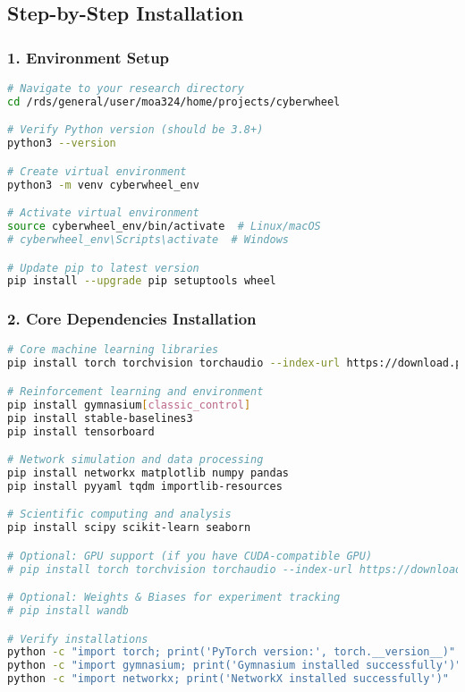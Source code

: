 \documentclass[12pt,a4paper]{article}
\begin{document}
\subsection{Step-by-Step Installation}

\subsubsection{1. Environment Setup}
\begin{lstlisting}[language=bash, caption=Initial Environment Setup]
# Navigate to your research directory
cd /rds/general/user/moa324/home/projects/cyberwheel

# Verify Python version (should be 3.8+)
python3 --version

# Create virtual environment
python3 -m venv cyberwheel_env

# Activate virtual environment
source cyberwheel_env/bin/activate  # Linux/macOS
# cyberwheel_env\Scripts\activate  # Windows

# Update pip to latest version
pip install --upgrade pip setuptools wheel
\end{lstlisting}

\subsubsection{2. Core Dependencies Installation}
\begin{lstlisting}[language=bash, caption=Install Core Dependencies]
# Core machine learning libraries
pip install torch torchvision torchaudio --index-url https://download.pytorch.org/whl/cpu

# Reinforcement learning and environment
pip install gymnasium[classic_control]
pip install stable-baselines3
pip install tensorboard

# Network simulation and data processing
pip install networkx matplotlib numpy pandas
pip install pyyaml tqdm importlib-resources

# Scientific computing and analysis
pip install scipy scikit-learn seaborn

# Optional: GPU support (if you have CUDA-compatible GPU)
# pip install torch torchvision torchaudio --index-url https://download.pytorch.org/whl/cu118

# Optional: Weights & Biases for experiment tracking
# pip install wandb

# Verify installations
python -c "import torch; print('PyTorch version:', torch.__version__)"
python -c "import gymnasium; print('Gymnasium installed successfully')"
python -c "import networkx; print('NetworkX installed successfully')"
\end{lstlisting}
\end{document}
